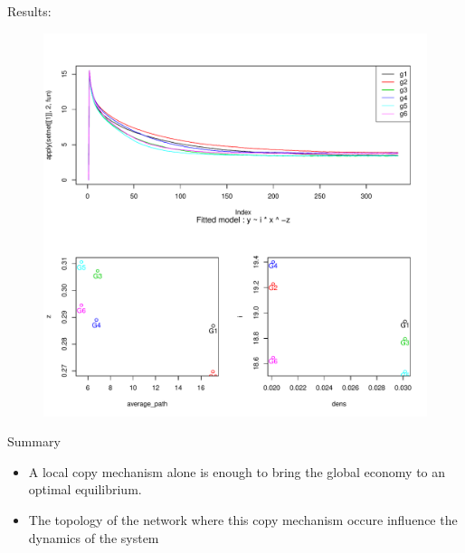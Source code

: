 \documentclass[12pt, handout=show,notes=show]{beamer}
\begin{document}
\begin{frame}{Results: }
    \begin{figure}[h]
	\begin{center}
	    \includegraphics[height=.9\textheight]{images/meanCurveAndFit.pdf}
	\end{center}
	\label{fig:meancurve}
    \end{figure}

\end{frame}
    



\begin{frame}{Summary}
\begin{itemize}
	\item A local copy mechanism alone is enough to bring the global economy to an optimal equilibrium.
		\vfill
	\item The topology of the network where this copy mechanism occure influence the dynamics of the system
		\vfill
\end{itemize}

\end{frame}
\end{document}
